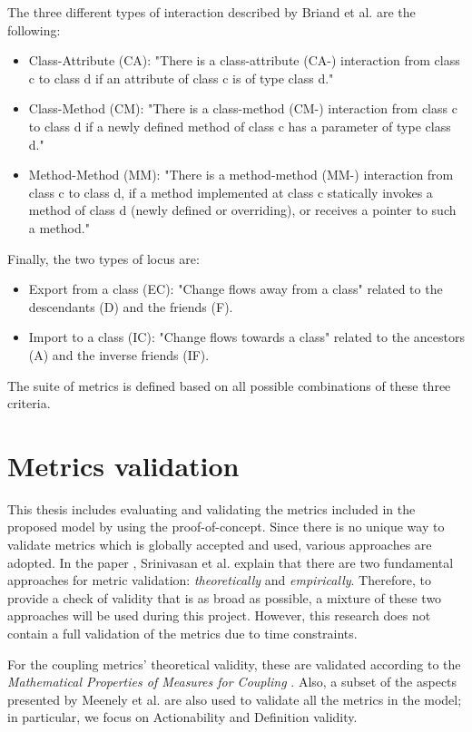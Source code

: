 \blankls
The three different types of interaction described by Briand et al. \cite{briand1997investigation} are the following:
\begin{itemize}
    \item Class-Attribute (CA): "There is a class-attribute (CA-) interaction from class c to class d if an attribute of class c is of type class d."
    \item Class-Method (CM): "There is a class-method (CM-) interaction from class c to class d if a newly defined method of class c has a parameter of type class d."
    \item Method-Method (MM): "There is a method-method (MM-) interaction from class c to class d, if a method implemented at class c statically invokes a method of class d (newly defined or overriding), or receives a pointer to such a method."
\end{itemize}

\blankls
Finally, the two types of locus are:
\begin{itemize}
  \item Export from a class (EC): "Change flows away from a class" related to the descendants (D) and the friends (F).
  \item Import to a class (IC): "Change flows towards a class" related to the ancestors (A) and the inverse friends (IF).
\end{itemize}

\blankls
The suite of metrics is defined based on all possible combinations of these three criteria.

\section{Metrics validation}
This thesis includes evaluating and validating the metrics included in the proposed model by using the proof-of-concept. Since there is no unique way to validate metrics which is globally accepted and used, various approaches are adopted. In the paper \cite{srinivasan2014software}, Srinivasan et al. explain that there are two fundamental approaches for metric validation: \textit{theoretically} and \textit{empirically}. Therefore, to provide a check of validity that is as broad as possible, a mixture of these two approaches will be used during this project. However, this research does not contain a full validation of the metrics due to time constraints.

For the coupling metrics' theoretical validity, these are validated according to the \textit{Mathematical Properties of Measures for Coupling} \cite{srinivasan2014software}. Also, a subset of the aspects presented by Meenely et al. \cite{Meneely2012} are also used to validate all the metrics in the model; in particular, we focus on Actionability and Definition validity.
